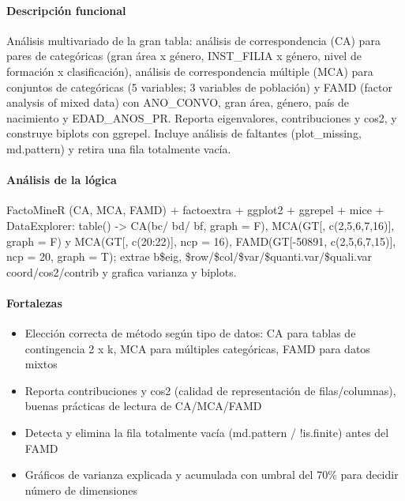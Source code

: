 \paragraph{Descripción funcional}
Análisis multivariado de la gran tabla: análisis de correspondencia (CA) para pares de categóricas (gran área x género, INST\_FILIA x género, nivel de formación x clasificación), análisis de correspondencia múltiple (MCA) para conjuntos de categóricas (5 variables; 3 variables de población) y FAMD (factor analysis of mixed data) con ANO\_CONVO, gran área, género, país de nacimiento y EDAD\_ANOS\_PR. Reporta eigenvalores, contribuciones y cos2, y construye biplots con ggrepel. Incluye análisis de faltantes (plot\_missing, md.pattern) y retira una fila totalmente vacía.

\paragraph{Análisis de la lógica}
FactoMineR (CA, MCA, FAMD) + factoextra + ggplot2 + ggrepel + mice + DataExplorer: table() -> CA(bc/ bd/ bf, graph = F), MCA(GT[, c(2,5,6,7,16)], graph = F) y MCA(GT[, c(20:22)], ncp = 16), FAMD(GT[-50891, c(2,5,6,7,15)], ncp = 20, graph = T); extrae b\$eig, \$row/\$col/\$var/\$quanti.var/\$quali.var coord/cos2/contrib y grafica varianza y biplots.

\paragraph{Fortalezas}
\begin{itemize}
  \item Elección correcta de método según tipo de datos: CA para tablas de contingencia 2 x k, MCA para múltiples categóricas, FAMD para datos mixtos
  \item Reporta contribuciones y cos2 (calidad de representación de filas/columnas), buenas prácticas de lectura de CA/MCA/FAMD
  \item Detecta y elimina la fila totalmente vacía (md.pattern / !is.finite) antes del FAMD
  \item Gráficos de varianza explicada y acumulada con umbral del 70\% para decidir número de dimensiones
\end{itemize}

